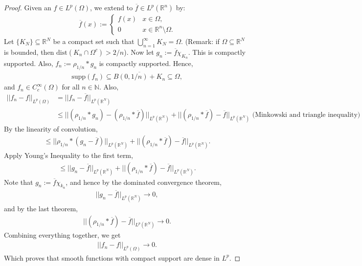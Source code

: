 \documentclass[psamsfonts]{amsart}
\theoremstyle{definition}
\theoremstyle{remark}
\newcommand{\R}[0]{\mathbb{R}}
\numberwithin{equation}{section}
\begin{document}
\begin{proof}
	Given an \( f \in L^p(\Omega) \), we extend to \( \overline{f} \in L^p(\R^n) \) by:
	\begin{align*}
		\overline{f}(x) := \begin{cases}
			f(x) & x \in \Omega, \\
			0 & x \in \R^n \setminus \Omega.
		\end{cases}
	\end{align*}
	Let \( \{ K_N \} \subseteq \R^N \) be a compact set such that \( \bigcup_{n=1}^\infty K_N = \Omega \). (Remark: if \( \Omega \subseteq \R^N \) is bounded, then \( \mathrm{dist}(K_n \cap \Omega^c) > 2/n \)). Now let \( g_n := \overline{f} \chi_{K_n} \). This is compactly supported. Also, \( f_n := \rho_{1/n} * g_n \) is compactly supported. Hence, 
	\begin{align*}
		\mathrm{supp}(f_n) \subseteq \overline{B(0, 1/n) + K_n} \subseteq \Omega,
	\end{align*}
	and \( f_n \in C_c^\infty (\Omega) \) for all \( n \in \mathbb{N} \). Also, 
	\begin{align*}
		|| f_n - f||_{L^p(\Omega)} & = || f_n - \overline{f} ||_{L^p(\R^N)} \\
		& \leq || ( \rho_{1/n} * g_n) - (\rho_{1/n} * \overline{f} ) ||_{L^p(\R^N) } + || (\rho_{1/n} * \overline{f} ) - \overline{f} ||_{L^p(\R^N)}  \text{ (Minkowski and triangle inequality)} 
	\end{align*}
	By the linearity of convolution, 
	\begin{align*}
		\leq || \rho_{1/n} * (g_n - \overline{f} ) ||_{L^p(\R^N)} + || (\rho_{1/n} * \overline{f} ) - \overline{f} ||_{L^p(\R^N) }.
	\end{align*}
	Apply Young's Inequality to the first term, 
	\begin{align*}
		\leq || g_n - \overline{f}||_{L^p(\R^N)} + || (\rho_{1/n} * \overline{f}) - \overline{f}||_{L^p(\R^N)}.
	\end{align*}
	Note that \( g_n := \overline{f}\chi_{k_n } \), and hence by the dominated convergence theorem, 
	\begin{align*}
		||g_n - \overline{f} ||_{L^p(\R^N)} \rightarrow 0, 
	\end{align*}
	and by the last theorem, 
	\begin{align*}
		|| ( \rho_{1/n} * \overline{f} ) - \overline{f} ||_{L^p(\R^N) } \rightarrow 0.
	\end{align*}
	Combining everything together, we get
	\begin{align*}
		||f_n - f||_{L^p(\Omega) } \rightarrow 0.
	\end{align*}
	Which proves that smooth functions with compact support are dense in \( L^p \).
\end{proof}
\end{document}
